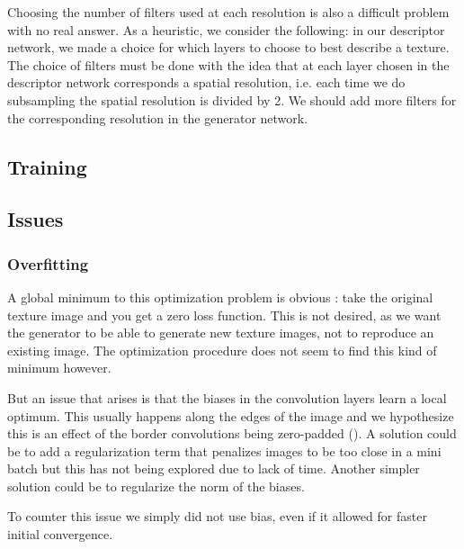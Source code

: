 \documentclass{article}
\begin{document}
Choosing the number of filters used at each resolution is also a difficult problem with no real answer. As a heuristic, we consider the following: in our descriptor network, we made a choice for which layers to choose to best describe a texture. The choice of filters must be done with the idea that at each layer chosen in the descriptor network corresponds a spatial resolution, i.e. each time we do subsampling the spatial resolution is divided by 2. We should add more filters for the corresponding resolution in the generator network.

\subsection{Training}

\subsection{Issues}
\subsubsection{Overfitting}

A global minimum to this optimization problem is obvious : take the original texture image and you get a zero loss function. This is not desired, as we want the generator to be able to generate new texture images, not to reproduce an existing image. The optimization procedure does not seem to find this kind of minimum however.

But an issue that arises is that the biases in the convolution layers learn a local optimum. This usually happens along the edges of the image and we hypothesize this is an effect of the border convolutions being zero-padded (\label{fig:overfit}). A solution could be to add a regularization term that penalizes images to be too close in a mini batch but this has not being explored due to lack of time. Another simpler solution could be to regularize the norm of the biases.

To counter this issue we simply did not use bias, even if it allowed for faster initial convergence.
\end{document}
